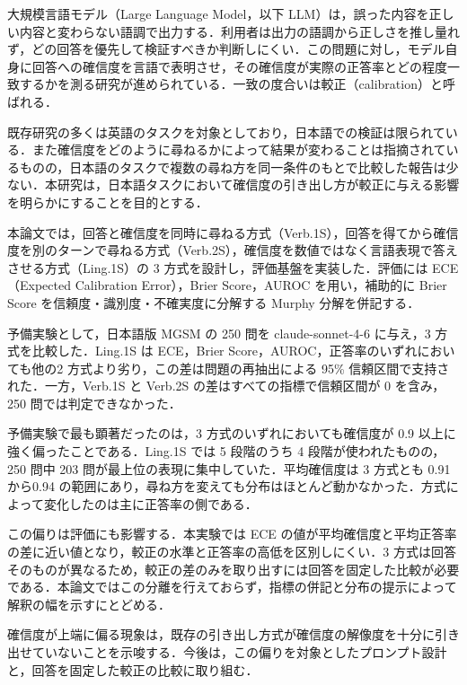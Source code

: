 大規模言語モデル（Large Language Model，以下 LLM）は，誤った内容を正しい内容と変わらない語調で出力する．利用者は出力の語調から正しさを推し量れず，どの回答を優先して検証すべきか判断しにくい．この問題に対し，モデル自身に回答への確信度を言語で表明させ，その確信度が実際の正答率とどの程度一致するかを測る研究が進められている．一致の度合いは較正（calibration）と呼ばれる．

既存研究の多くは英語のタスクを対象としており，日本語での検証は限られている．また確信度をどのように尋ねるかによって結果が変わることは指摘されているものの，日本語のタスクで複数の尋ね方を同一条件のもとで比較した報告は少ない．本研究は，日本語タスクにおいて確信度の引き出し方が較正に与える影響を明らかにすることを目的とする．

本論文では，回答と確信度を同時に尋ねる方式（Verb.1S），回答を得てから確信度を別のターンで尋ねる方式（Verb.2S），確信度を数値ではなく言語表現で答えさせる方式（Ling.1S）の 3 方式を設計し，評価基盤を実装した．評価には ECE（Expected Calibration Error），Brier Score，AUROC を用い，補助的に Brier Score を信頼度・識別度・不確実度に分解する Murphy 分解を併記する．

予備実験として，日本語版 MGSM の 250 問を claude-sonnet-4-6 に与え，3 方式を比較した．Ling.1S は ECE，Brier Score，AUROC，正答率のいずれにおいても他の2 方式より劣り，この差は問題の再抽出による 95\% 信頼区間で支持された．一方，Verb.1S と Verb.2S の差はすべての指標で信頼区間が 0 を含み，250 問では判定できなかった．

予備実験で最も顕著だったのは，3 方式のいずれにおいても確信度が 0.9 以上に強く偏ったことである．Ling.1S では 5 段階のうち 4 段階が使われたものの，250 問中 203 問が最上位の表現に集中していた．平均確信度は 3 方式とも 0.91 から0.94 の範囲にあり，尋ね方を変えても分布はほとんど動かなかった．方式によって変化したのは主に正答率の側である．

この偏りは評価にも影響する．本実験では ECE の値が平均確信度と平均正答率の差に近い値となり，較正の水準と正答率の高低を区別しにくい．3 方式は回答そのものが異なるため，較正の差のみを取り出すには回答を固定した比較が必要である．本論文ではこの分離を行えておらず，指標の併記と分布の提示によって解釈の幅を示すにとどめる．

確信度が上端に偏る現象は，既存の引き出し方式が確信度の解像度を十分に引き出せていないことを示唆する．今後は，この偏りを対象としたプロンプト設計と，回答を固定した較正の比較に取り組む．
